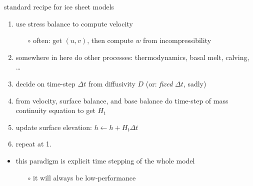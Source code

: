\begin{frame}{standard recipe for ice sheet models}

\begin{enumerate}
  \item use stress balance to compute velocity
      \begin{itemize}
      \item[$\circ$] often: get $(u,v)$, then compute $w$ from incompressibility
      \end{itemize}
  \item somewhere in here do other processes: thermodynamics, basal melt, calving, \dots
  \item decide on time-step $\Delta t$ from diffusivity $D$ \hfill (or: \emph{fixed} $\Delta t$, sadly)
  \item from velocity, surface balance, and base balance do time-step of mass continuity equation to get $H_t$
  \item update surface elevation: $h \gets h+H_t \Delta t$
  \item repeat at 1.
\end{enumerate}

\bigskip
\begin{itemize}
\item this paradigm is \alert{explicit time stepping of the whole model}
  \begin{itemize}
  \item[$\circ$]  it will always be low-performance
  \end{itemize}
\end{itemize}
\end{frame}
